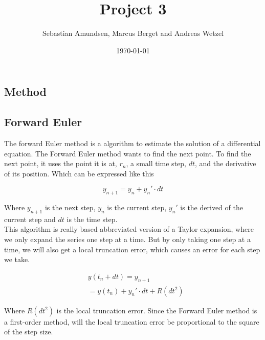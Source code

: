 \documentclass{article}
\begin{document}
\title{Project 3}
\author{Sebastian Amundsen, Marcus Berget and Andreas Wetzel}
\date{\today}

\maketitle

\begin{abstract}

\end{abstract}

\begin{multicols}{2}

\section{Method}

\subsection{Forward Euler}
The forward Euler method is a algorithm to estimate the solution of a differential equation. The Forward Euler method wants to find the next point. To find the next point, it uses the point it is at, $r_n$, a small time step, $dt$, and the derivative of its position. Which can be expressed like this

\begin{equation}
y_{n+1}=y_n + y_n'\cdot dt
\label{eq:yn1}
\end{equation}

Where $y_{n+1}$ is the next step, $y_n$ is the current step, $y_n'$ is the derived of the current step and $dt$ is the time step.\\
This algorithm is really based abbreviated version of a Taylor expansion, where we only expand the series one step at a time. But by only taking one step at a time, we will also get a local truncation error, which causes an error for each step we take. 

\begin{equation}
\begin{split}
&y(t_n+dt)=y_{n+1}\\
&=y(t_n)+y_n'\cdot dt + R(dt^2)
\end{split}
\label{eq:ytndt}
\end{equation} 

Where $R(dt^2)$ is the local truncation error. Since the Forward Euler method is a first-order method, will the local truncation error be proportional to the square of the step size. 


\end{multicols}
\end{document}
